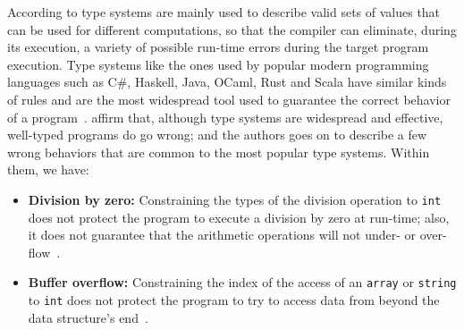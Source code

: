 \documentclass[
  oneside,
  english,
  coorientadorbanca,
  embeddedlogo,
  noabntexcite
]{ufsc-thesis-rn46-2019}
\newcommand{\code}[1]{\texttt{#1}}
\begin{document}
According to \textcite{jhala2020tutorial} type systems are mainly used to describe valid sets of values that can be used for different computations, so that the compiler can eliminate, during its execution, a variety of possible run-time errors during the target program execution.
Type systems like the ones used by popular modern programming languages such as C\#, Haskell, Java, OCaml, Rust and Scala have similar kinds of rules and are the most widespread tool used to guarantee the correct behavior of a program~\cite{jhala2020tutorial}.
\textcite{jhala2020tutorial} affirm that, although type systems are widespread and effective, well-typed programs do go wrong; and the authors goes on to describe a few wrong behaviors that are common to the most popular type systems. Within them, we have:
\begin{itemize}
  \item \textbf{Division by zero:} Constraining the types of the division operation to \code{int} does not protect the program to execute a division by zero at run-time; also, it does not guarantee that the arithmetic operations will not under- or over-flow~\cite{jhala2020tutorial}.
  \item \textbf{Buffer overflow:} Constraining the index of the access of an \code{array} or \code{string} to \code{int} does not protect the program to try to access data from beyond the data structure's end~\cite{jhala2020tutorial}.
\end{itemize}
\end{document}
